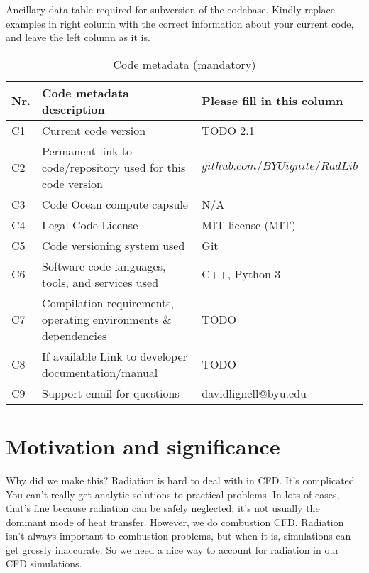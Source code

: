 \documentclass[preprint,12pt, a4paper]{elsarticle}
\begin{document}
Ancillary data table required for subversion of the codebase. Kindly replace examples in right column with the correct information about your current code, and leave the left column as it is.

\begin{table}[H]
\begin{tabular}{|l|p{6.5cm}|p{6.5cm}|}
\hline
\textbf{Nr.} & \textbf{Code metadata description} & \textbf{Please fill in this column} \\
\hline
C1 & Current code version & TODO 2.1 \\
\hline
C2 & Permanent link to code/repository used for this code version & $github.com/BYUignite/RadLib$ \\
\hline
C3 & Code Ocean compute capsule & N/A \\
\hline
C4 & Legal Code License   & MIT license (MIT) \\
\hline
C5 & Code versioning system used & Git \\
\hline
C6 & Software code languages, tools, and services used & C++, Python 3 \\
\hline
C7 & Compilation requirements, operating environments \& dependencies & TODO \\
\hline
C8 & If available Link to developer documentation/manual & TODO \\
\hline
C9 & Support email for questions & davidlignell@byu.edu \\
\hline
\end{tabular}
\caption{Code metadata (mandatory)}
\label{} 
\end{table}


\linenumbers


\section{Motivation and significance}
\label{s:motivation}

Why did we make this? Radiation is hard to deal with in CFD. It's complicated. You can't really get analytic solutions to practical problems. In lots of cases, that's fine because radiation can be safely neglected; it's not usually the dominant mode of heat transfer. However, we do combustion CFD. Radiation isn't always important to combustion problems, but when it is, simulations can get grossly inaccurate. So we need a nice way to account for radiation in our CFD simulations. 
\end{document}
